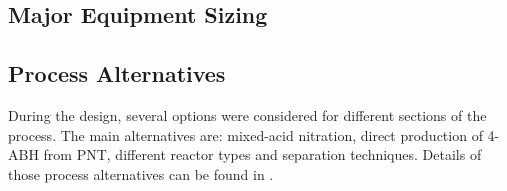 

\subsection{Major Equipment Sizing}


\subsection{Process Alternatives}
During the design, several options were considered for different sections of the process. The main alternatives are: mixed-acid  nitration, direct production of 4-ABH from PNT, different reactor types and separation techniques. Details of those process alternatives can be found in .




